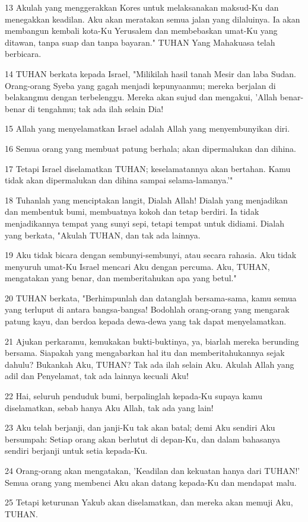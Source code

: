 \par 13 Akulah yang menggerakkan Kores untuk melaksanakan maksud-Ku dan menegakkan keadilan. Aku akan meratakan semua jalan yang dilaluinya. Ia akan membangun kembali kota-Ku Yerusalem dan membebaskan umat-Ku yang ditawan, tanpa suap dan tanpa bayaran." TUHAN Yang Mahakuasa telah berbicara.
\par 14 TUHAN berkata kepada Israel, "Milikilah hasil tanah Mesir dan laba Sudan. Orang-orang Syeba yang gagah menjadi kepunyaanmu; mereka berjalan di belakangmu dengan terbelenggu. Mereka akan sujud dan mengakui, 'Allah benar-benar di tengahmu; tak ada ilah selain Dia!
\par 15 Allah yang menyelamatkan Israel adalah Allah yang menyembunyikan diri.
\par 16 Semua orang yang membuat patung berhala; akan dipermalukan dan dihina.
\par 17 Tetapi Israel diselamatkan TUHAN; keselamatannya akan bertahan. Kamu tidak akan dipermalukan dan dihina sampai selama-lamanya.'"
\par 18 Tuhanlah yang menciptakan langit, Dialah Allah! Dialah yang menjadikan dan membentuk bumi, membuatnya kokoh dan tetap berdiri. Ia tidak menjadikannya tempat yang sunyi sepi, tetapi tempat untuk didiami. Dialah yang berkata, "Akulah TUHAN, dan tak ada lainnya.
\par 19 Aku tidak bicara dengan sembunyi-sembunyi, atau secara rahasia. Aku tidak menyuruh umat-Ku Israel mencari Aku dengan percuma. Aku, TUHAN, mengatakan yang benar, dan memberitahukan apa yang betul."
\par 20 TUHAN berkata, "Berhimpunlah dan datanglah bersama-sama, kamu semua yang terluput di antara bangsa-bangsa! Bodohlah orang-orang yang mengarak patung kayu, dan berdoa kepada dewa-dewa yang tak dapat menyelamatkan.
\par 21 Ajukan perkaramu, kemukakan bukti-buktinya, ya, biarlah mereka berunding bersama. Siapakah yang mengabarkan hal itu dan memberitahukannya sejak dahulu? Bukankah Aku, TUHAN? Tak ada ilah selain Aku. Akulah Allah yang adil dan Penyelamat, tak ada lainnya kecuali Aku!
\par 22 Hai, seluruh penduduk bumi, berpalinglah kepada-Ku supaya kamu diselamatkan, sebab hanya Aku Allah, tak ada yang lain!
\par 23 Aku telah berjanji, dan janji-Ku tak akan batal; demi Aku sendiri Aku bersumpah: Setiap orang akan berlutut di depan-Ku, dan dalam bahasanya sendiri berjanji untuk setia kepada-Ku.
\par 24 Orang-orang akan mengatakan, 'Keadilan dan kekuatan hanya dari TUHAN!' Semua orang yang membenci Aku akan datang kepada-Ku dan mendapat malu.
\par 25 Tetapi keturunan Yakub akan diselamatkan, dan mereka akan memuji Aku, TUHAN.

